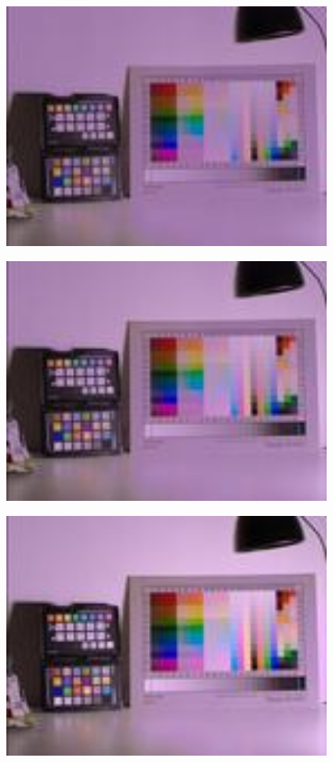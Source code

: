 \begin{center}
\includegraphics[height=8cm]{images/100ms-5ms-32-tiny}
\end{center}

\begin{center}
\includegraphics[height=8cm]{images/100ms-10ms-32-tiny}
\end{center}

\begin{center}
\includegraphics[height=8cm]{images/100ms-20ms-32-tiny}
\end{center}

